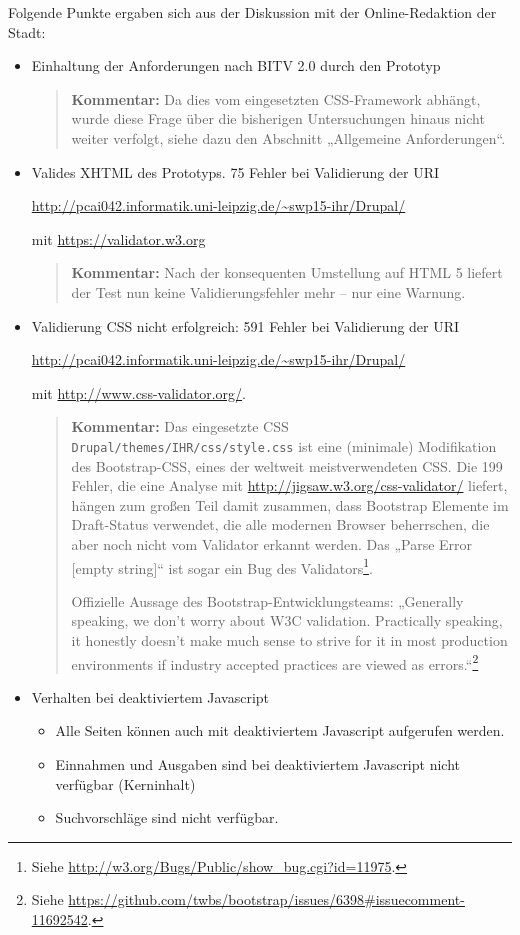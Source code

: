 \documentclass[11pt,a4paper,twoside]{article}
\newcommand{\kommentar}[1]{\begin{quote}\textbf{Kommentar:} #1 \end{quote}}
\begin{document}
Folgende Punkte ergaben sich aus der Diskussion mit der Online-Redaktion der
Stadt:
\begin{itemize}\itemsep0pt
\item Einhaltung der Anforderungen nach BITV 2.0 durch den Prototyp
\kommentar{Da dies vom eingesetzten CSS-Framework abhängt, wurde diese Frage
  über die bisherigen Untersuchungen hinaus nicht weiter verfolgt, siehe dazu
  den Abschnitt „Allgemeine Anforderungen“.}
\item Valides XHTML des Prototyps. 75 Fehler bei Validierung der URI
  \begin{center}
    \url{http://pcai042.informatik.uni-leipzig.de/~swp15-ihr/Drupal/}
  \end{center}
  mit \url{https://validator.w3.org} 

\kommentar{Nach der konsequenten Umstellung auf HTML 5 liefert der Test nun
  keine Validierungsfehler mehr -- nur eine Warnung. }
\item Validierung CSS nicht erfolgreich: 591 Fehler bei Validierung der URI
  \begin{center}
    \url{http://pcai042.informatik.uni-leipzig.de/~swp15-ihr/Drupal/}
  \end{center}
  mit \url{http://www.css-validator.org/}. 

\kommentar{Das eingesetzte CSS \texttt{Drupal/themes/IHR/css/style.css} ist
  eine (minimale) Modifikation des Bootstrap-CSS, eines der weltweit
  meistverwendeten CSS. Die 199 Fehler, die eine Analyse mit
  \url{http://jigsaw.w3.org/css-validator/} liefert, hängen zum großen Teil
  damit zusammen, dass Bootstrap Elemente im Draft-Status verwendet, die alle
  modernen Browser beherrschen, die aber noch nicht vom Validator erkannt
  werden.  Das „Parse Error [empty string]“ ist sogar ein Bug des
  Validators\footnote{Siehe
    \url{http://w3.org/Bugs/Public/show_bug.cgi?id=11975}.}.

  Offizielle Aussage des Bootstrap-Entwicklungsteams: „Generally speaking, we
  don't worry about W3C validation. Practically speaking, it honestly doesn't
  make much sense to strive for it in most production environments if industry
  accepted practices are viewed as errors.“\footnote{Siehe
    \url{https://github.com/twbs/bootstrap/issues/6398#issuecomment-11692542}.}
  }

\item Verhalten bei deaktiviertem Javascript
  \begin{itemize}
  \item Alle Seiten können auch mit deaktiviertem Javascript aufgerufen
    werden. 
  \item Einnahmen und Ausgaben sind bei deaktiviertem Javascript nicht
    verfügbar (Kerninhalt)
  \item Suchvorschläge sind nicht verfügbar.
  \end{itemize}


\end{itemize}
\end{document}
